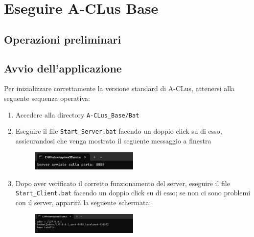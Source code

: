 \section{Eseguire A-CLus Base}

\subsection*{Operazioni preliminari}


\subsection*{Avvio dell'applicazione}

Per inizializzare correttamente la versione standard di A-CLus, attenersi alla seguente sequenza operativa:


\begin{enumerate}
    \item Accedere alla directory \texttt{A-CLus\_Base/Bat}
    \item Eseguire il file \texttt{Start\_Server.bat} facendo un doppio click su di esso, assicurandosi che venga mostrato il seguente messaggio a finestra
    
    \begin{figure}[h!]
        \centering
        \includegraphics[width=0.5\textwidth]{images/server in esecuzione.png}
    \end{figure}

    \item Dopo aver verificato il corretto funzionamento del server, eseguire il file \texttt{Start\_Client.bat} facendo un doppio click su di esso; se non ci sono problemi con il server, apparirà la seguente schermata:
    
    \begin{figure}[h!]
        \centering
        \includegraphics[width=0.5\textwidth]{images/client in esecuzione.png}
        
    \end{figure}
    
\end{enumerate}

